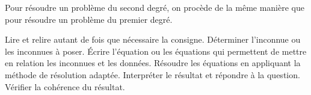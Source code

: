 \documentclass[a4paper,12pt]{report}
\begin{document}
Pour résoudre un problème du second degré, on procède de la même manière que pour résoudre un problème du premier degré.
\begin{tasks}
	\task Lire et relire autant de fois que nécessaire la consigne.
	\task Déterminer l'inconnue ou les inconnues à poser.
	\task Écrire l'équation ou les équations qui permettent de mettre en relation les inconnues et les données.
	\task Résoudre les équations en appliquant la méthode de résolution adaptée.
	\task Interpréter le résultat et répondre à la question.
	\task Vérifier la cohérence du résultat.
\end{tasks}

\begin{boiteExT}

	\vspace{18cm}	

\end{boiteExT}
\end{document}
